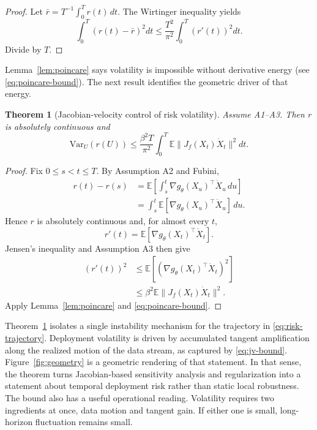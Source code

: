 \documentclass[conference]{IEEEtran}
\newtheorem{theorem}{Theorem}
\newcommand{\E}{\mathbb{E}}
\newcommand{\Var}{\mathrm{Var}}
\begin{document}
\begin{proof}
Let $\bar r=T^{-1}\int_0^T r(t)\,dt$. The Wirtinger inequality yields
\[
\int_0^T (r(t)-\bar r)^2dt \le \frac{T^2}{\pi^2}\int_0^T (r'(t))^2dt.
\]
Divide by $T$.
\end{proof}

Lemma~\ref{lem:poincare} says volatility is impossible without derivative energy (see \eqref{eq:poincare-bound}). The next result identifies the geometric driver of that energy.

\begin{theorem}[Jacobian-velocity control of risk volatility]
\label{thm:jv}
Assume A1--A3. Then $r$ is absolutely continuous and
\begin{equation}
\label{eq:jv-bound}
\Var_U(r(U)) \le \frac{\beta^2 T}{\pi^2}\int_0^T \E\|J_f(X_t)\dot X_t\|^2dt.
\end{equation}
\end{theorem}

\begin{proof}
Fix $0\le s<t\le T$. By Assumption A2 and Fubini,
\begin{align*}
r(t)-r(s)
&=
\E\!\left[\int_s^t \nabla g_\theta(X_u)^\top \dot X_u\,du\right] \\
&=
\int_s^t \E[\nabla g_\theta(X_u)^\top \dot X_u]\,du.
\end{align*}
Hence $r$ is absolutely continuous and, for almost every $t$,
\[
r'(t)=\E[\nabla g_\theta(X_t)^\top \dot X_t].
\]
Jensen's inequality and Assumption A3 then give
\[
\begin{aligned}
(r'(t))^2
&\le \E[(\nabla g_\theta(X_t)^\top \dot X_t)^2] \\
&\le \beta^2 \E\|J_f(X_t)\dot X_t\|^2.
\end{aligned}
\]
Apply Lemma~\ref{lem:poincare} and \eqref{eq:poincare-bound}.
\end{proof}

Theorem~\ref{thm:jv} isolates a single instability mechanism for the trajectory in \eqref{eq:risk-trajectory}. Deployment volatility is driven by accumulated tangent amplification along the realized motion of the data stream, as captured by \eqref{eq:jv-bound}. Figure~\ref{fig:geometry} is a geometric rendering of that statement. In that sense, the theorem turns Jacobian-based sensitivity analysis and regularization \cite{sokolic-jacobian,novak-sensitivity,kim-jacobian} into a statement about temporal deployment risk rather than static local robustness. The bound also has a useful operational reading. Volatility requires two ingredients at once, data motion and tangent gain. If either one is small, long-horizon fluctuation remains small.
\end{document}

